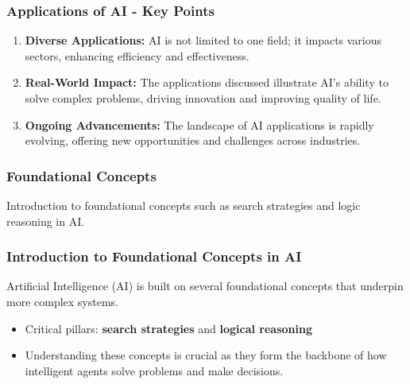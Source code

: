 \documentclass[aspectratio=169]{beamer}
\begin{document}
\begin{frame}[fragile]
    \frametitle{Applications of AI - Key Points}
    \begin{enumerate}
        \item \textbf{Diverse Applications:} AI is not limited to one field; it impacts various sectors, enhancing efficiency and effectiveness.
        \item \textbf{Real-World Impact:} The applications discussed illustrate AI's ability to solve complex problems, driving innovation and improving quality of life.
        \item \textbf{Ongoing Advancements:} The landscape of AI applications is rapidly evolving, offering new opportunities and challenges across industries.
    \end{enumerate}
\end{frame}

\begin{frame}[fragile]
    \frametitle{Foundational Concepts}
    Introduction to foundational concepts such as search strategies and logic reasoning in AI.
\end{frame}

\begin{frame}[fragile]
    \frametitle{Introduction to Foundational Concepts in AI}
    Artificial Intelligence (AI) is built on several foundational concepts that underpin more complex systems.
    \begin{itemize}
        \item Critical pillars: \textbf{search strategies} and \textbf{logical reasoning}
        \item Understanding these concepts is crucial as they form the backbone of how intelligent agents solve problems and make decisions.
    \end{itemize}
\end{frame}
\end{document}
